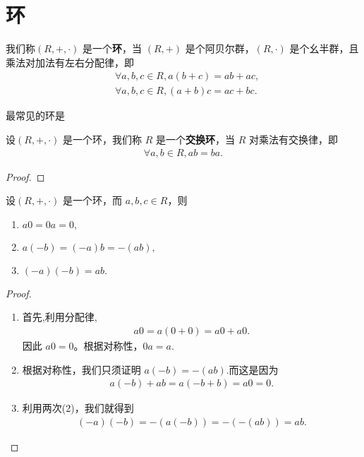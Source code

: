 \documentclass[../../main.tex]{subfiles}
\begin{document}
\section{环}

\begin{definition}[环]
我们称$(R, +, \cdot)$ 是一个\textbf{环}，当 $(R, +)$ 是个阿贝尔群，$(R, \cdot)$ 是个幺半群，且乘法对加法有左右分配律，即
\begin{align*}
&\forall a,b,c\in R, a(b + c)=ab + ac ,\\
&\forall a,b,c\in R, (a + b)c=ac + bc .
\end{align*} 
\end{definition}
\begin{note}
最常见的环是
\end{note}

\begin{definition}[交换环]
设$(R, +, \cdot)$ 是一个环，我们称 $R$ 是一个\textbf{交换环}，当 $R$ 对乘法有交换律，即
\begin{align*}
\forall a,b\in R, ab = ba.
\end{align*}
\end{definition}

\begin{example}

\end{example}
\begin{proof}

\end{proof}

\begin{proposition}
设$(R, +, \cdot)$ 是一个环，而 $a,b,c\in R$，则
\begin{enumerate}[(1)]
\item $a0 = 0a = 0,$

\item $a(-b)=(-a)b=-(ab),$

\item $(-a)(-b)=ab.$
\end{enumerate}
\end{proposition}
\begin{proof}
\begin{enumerate}[(1)]
\item 首先,利用分配律,
\begin{align*}
a0 = a(0 + 0)=a0 + a0.
\end{align*}
因此 $a0 = 0$。根据对称性，$0a = a$.

\item 根据对称性，我们只须证明 $a(-b)=-(ab)$.而这是因为
\begin{align*}
a(-b)+ab = a(-b + b)=a0 = 0.
\end{align*}

\item 利用两次(2)，我们就得到
\begin{align*}
(-a)(-b)=-(a(-b))=-(-(ab)) = ab.
\end{align*} 
\end{enumerate}
\end{proof}
\end{document}
